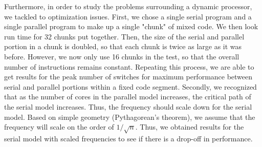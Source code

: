 Furthermore, in order to study the problems surrounding a dynamic processor, we tackled to optimization issues. First, we chose a single serial program and a single parallel program to make up a single "chunk" of mixed code. We then look run time for 32 chunks put together. Then, the size of the serial and parallel portion in a chunk is doubled, so that each chunk is twice as large as it was before. However, we now only use 16 chunks in the test, so that the overall number of instructions remains constant. Repeating this process, we are able to get results for the peak number of switches for maximum performance between serial and parallel portions within a fixed code segment. Secondly, we recognized that as the number of cores in the parallel model increases, the critical path of the serial model increases. Thus, the frequency should scale down for the serial model. Based on simple geometry (Pythagorean's theorem), we assume that the frequency will scale on the order of $1 / \sqrt{n}$. Thus, we obtained results for the serial model with scaled frequencies to see if there is a drop-off in performance.